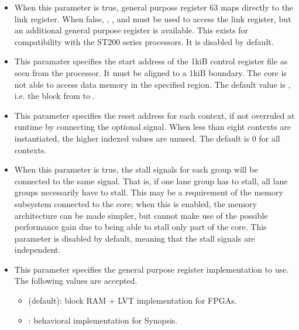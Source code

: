 \begin{itemize}
\begin{itemize}
\item {}

When this parameter is true, general purpose register 63 maps directly to the
link register. When false, , ,  and 
must be used to access the link register, but an additional general purpose
register is available. This exists for compatibility with the ST200 series
processors. It is disabled by default.

\item {}

This paramater specifies the start address of the 1kiB control register file as
seen from the processor. It must be aligned to a 1kiB boundary. The core is not
able to access data memory in the specified region. The default value is
, i.e. the block from  to .

\item {}

This parameter specifies the reset address for each context, if not overruled at
runtime by connecting the optional  signal. When less
than eight contexts are instantiated, the higher indexed values are unused. The
default is 0 for all contexts.

\item {}

When this parameter is true, the stall signals for each group will be connected
to the same signal. That is, if one lane group has to stall, all lane groups
necessarily have to stall. This may be a requirement of the memory subsystem
connected to the core; when this is enabled, the memory architecture can be made
simpler, but cannot make use of the possible performance gain due to being able
to stall only part of the core. This parameter is disabled by default, meaning
that the stall signals are independent.

\item {}

This parameter specifies the general purpose register implementation to use.
The following values are accepted.

\begin{itemize}
\item {} (default): block RAM + LVT implementation for
FPGAs.
\item {}: behavioral implementation for Synopsis.
\end{itemize}


\end{itemize}
\end{itemize}
